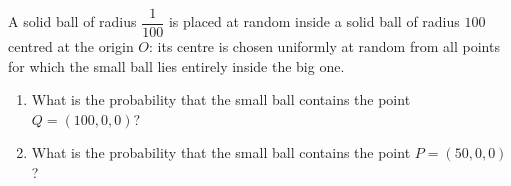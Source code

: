 A solid ball of radius $\dfrac{1}{100}$ is placed at random inside a solid ball of radius $100$ centred at the origin $O$: its centre is chosen uniformly at random from all points for which the small ball lies entirely inside the big one.
\begin{enumerate}
\item[(a)] What is the probability that the small ball contains the point $Q=(100,0,0)$?
\item[(b)] What is the probability that the small ball contains the point $P=(50,0,0)$?
\end{enumerate}
